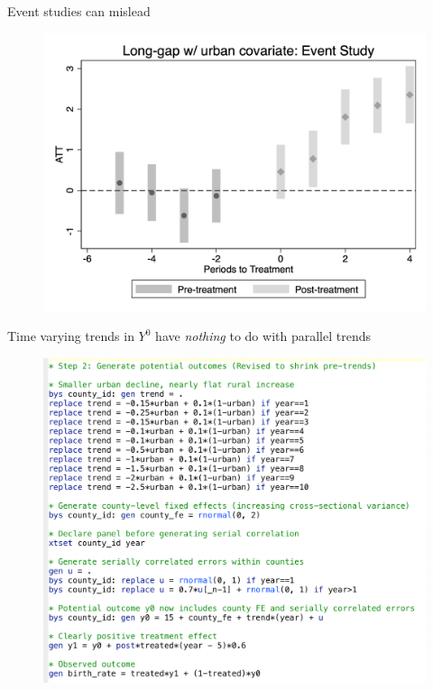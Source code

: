 \documentclass{beamer}
\begin{document}
\begin{frame}{Event studies can mislead}

\begin{figure}
    \centering
    \includegraphics[height=0.75\textheight]{./lecture_includes/es_correct.png}
\end{figure}

\end{frame}

\begin{frame}{Time varying trends in $Y^0$ have \emph{nothing} to do with parallel trends}

\begin{figure}
    \centering
    \includegraphics[height=0.75\textheight]{./lecture_includes/misleading_eventstudy_code}
\end{figure}

\end{frame}
\end{document}
